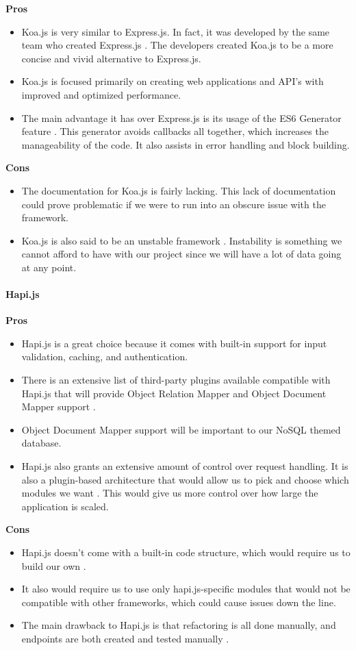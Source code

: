 		\textbf{Pros}
			\begin{itemize}
				\item Koa.js is very similar to Express.js. In fact, it was developed by the same team who created Express.js \cite{expressKoaSails}. The developers created Koa.js to be a more concise and vivid alternative to Express.js. 
				\item Koa.js is focused primarily on creating web applications and API's with improved and optimized performance. 
				\item The main advantage it has over Express.js is its usage of the ES6 Generator feature \cite{expressKoaSails}. This generator avoids callbacks all together, which increases the manageability of the code. It also assists in error handling and block building.
			\end{itemize}	
		\textbf{Cons}
			\begin{itemize}
				\item The documentation for Koa.js is fairly lacking. This lack of documentation could prove problematic if we were to run into an obscure issue with the framework. 
				\item Koa.js is also said to be an unstable framework \cite{expressKoaSails}. Instability is something we cannot afford to have with our project since we will have a lot of data going at any point.
			\end{itemize}	
	\paragraph{Hapi.js}
	
		\textbf{Pros} 
			\begin{itemize}
				\item Hapi.js is a great choice because it comes with built-in support for input validation, caching, and authentication. 
				\item There is an extensive list of third-party plugins available compatible with Hapi.js that will provide Object Relation Mapper and Object Document Mapper support \cite{hapi}. 
				\item Object Document Mapper support will be important to our NoSQL themed database. 
				\item Hapi.js also grants an extensive amount of control over request handling. It is also a plugin-based architecture that would allow us to pick and choose which modules we want \cite{hapi}. This would give us more control over how large the application is scaled.
			\end{itemize}	
		\textbf{Cons}
			\begin{itemize}
				\item Hapi.js doesn't come with a built-in code structure, which would require us to build our own \cite{hapi}.
				\item It also would require us to use only hapi.js-specific modules that would not be compatible with other frameworks, which could cause issues down the line. 
				\item The main drawback to Hapi.js is that refactoring is all done manually, and endpoints are both created and tested manually \cite{hapi}.
			\end{itemize}	
	
